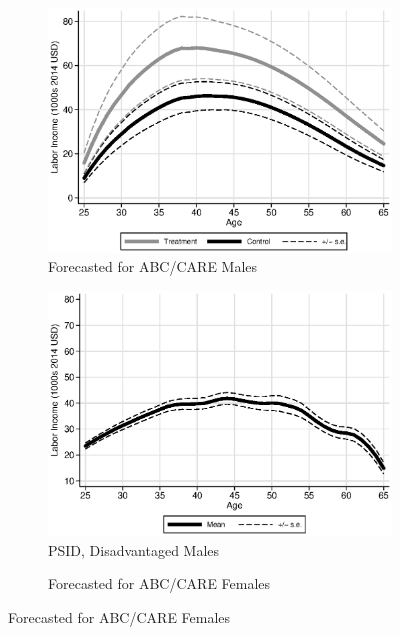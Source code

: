 \begin{figure}
\centering
\caption{Labor Income Profile, Predictions and Comparison to PSID}\label{fig:labor-income-profiles}
\begin{subfigure}[h]{0.4\textwidth}
		\centering
		\caption{Forecasted for ABC/CARE Males} \label{fig:abcare1}
		\includegraphics[width=\textwidth]{output/labor_25-60_male_1.eps}
\end{subfigure}%
\begin{subfigure}[h]{0.4\textwidth}
	\centering
	\caption{PSID, Disadvantaged Males} \label{fig:psid1}
		\includegraphics[width=\textwidth]{output/psid_incomeprofiles_s1.eps}
\end{subfigure}
\begin{subfigure}[h]{0.4\textwidth}
		\centering
		\caption{Forecasted for ABC/CARE Females} \label{fig:abcare0}

\end{subfigure}
\end{figure}
